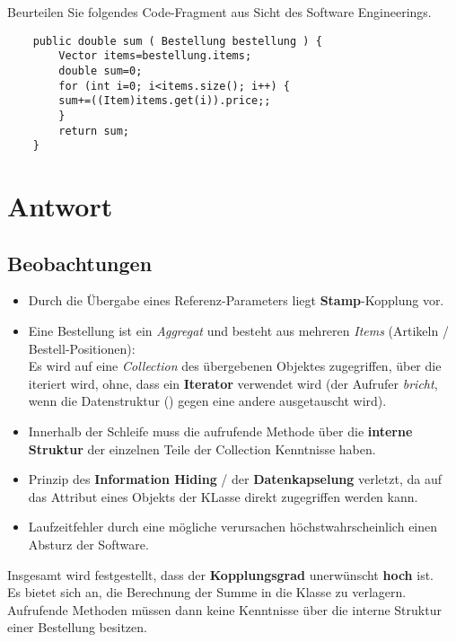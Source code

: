 Beurteilen Sie folgendes Code-Fragment aus Sicht des Software Engineerings.

\begin{verbatim}
    public double sum ( Bestellung bestellung ) {
        Vector items=bestellung.items;
        double sum=0;
        for (int i=0; i<items.size(); i++) {
        sum+=((Item)items.get(i)).price;;
        }
        return sum;
    }
\end{verbatim}

\section*{Antwort}

\subsection*{Beobachtungen}
\begin{itemize}
    \item Durch die Übergabe eines Referenz-Parameters liegt \textbf{Stamp}-Kopplung vor.
    \item Eine Bestellung ist ein \textit{Aggregat} und besteht aus mehreren \textit{Items} (Artikeln / Bestell-Positionen):\\
    Es wird auf eine \textit{Collection} des übergebenen Objektes zugegriffen, über die iteriert wird, ohne, dass ein \textbf{Iterator} verwendet wird (der Aufrufer \textit{bricht}, wenn die Datenstruktur () gegen eine andere ausgetauscht wird).
    \item Innerhalb der Schleife muss die aufrufende Methode über die \textbf{interne Struktur} der einzelnen Teile der Collection Kenntnisse haben.
    \item Prinzip des \textbf{Information Hiding} / der \textbf{Datenkapselung} verletzt, da auf das Attribut  eines Objekts der KLasse  direkt zugegriffen werden kann.
    \item Laufzeitfehler durch eine mögliche  verursachen höchstwahrscheinlich einen Absturz der Software.
\end{itemize}

\noindent
Insgesamt wird festgestellt, dass der \textbf{Kopplungsgrad} unerwünscht \textbf{hoch} ist.\\

\noindent
Es bietet sich an, die Berechnung der Summe in die Klasse  zu verlagern.\\
Aufrufende Methoden müssen dann keine Kenntnisse über die interne Struktur einer Bestellung besitzen.